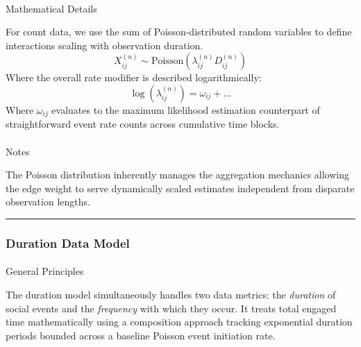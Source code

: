 \documentclass[
  letterpaper,
  DIV=11,
  numbers=noendperiod]{scrartcl}
\makeatletter
\let\oldparagraph\paragraph
\renewcommand{\paragraph}{
    \@ifstar
      \xxxParagraphStar
      \xxxParagraphNoStar
  }
\newcommand{\xxxParagraphStar}[1]{\oldparagraph*{#1}\mbox{}}
\newcommand{\xxxParagraphNoStar}[1]{\oldparagraph{#1}\mbox{}}
\makeatother
\begin{document}
\paragraph{Mathematical Details}\label{mathematical-details-1}

For count data, we use the sum of Poisson-distributed random variables
to define interactions scaling with observation duration. \[
X_{ij}^{(n)} \sim \text{Poisson}(\lambda_{ij}^{(n)} D_{ij}^{(n)})
\] Where the overall rate modifier is described logarithmically: \[
\log(\lambda_{ij}^{(n)}) = \omega_{ij} + \dots
\] Where \(\omega_{ij}\) evaluates to the maximum likelihood estimation
counterpart of straightforward event rate counts across cumulative time
blocks.

\paragraph{Notes}\label{notes-1}

\begin{tcolorbox}[enhanced jigsaw, colframe=quarto-callout-note-color-frame, bottomtitle=1mm, coltitle=black, titlerule=0mm, colbacktitle=quarto-callout-note-color!10!white, colback=white, opacitybacktitle=0.6, rightrule=.15mm, toptitle=1mm, opacityback=0, arc=.35mm, left=2mm, title=\textcolor{quarto-callout-note-color}{\faInfo}\hspace{0.5em}{Note}, breakable, bottomrule=.15mm, toprule=.15mm, leftrule=.75mm]

The Poisson distribution inherently manages the aggregation mechanics
allowing the edge weight to serve dynamically scaled estimates
independent from disparate observation lengths.

\end{tcolorbox}

\begin{center}\rule{0.5\linewidth}{0.5pt}\end{center}

\subsubsection{Duration Data Model}\label{duration-data-model}

\paragraph{General Principles}\label{general-principles-5}

The duration model simultaneously handles two data metrics: the
\emph{duration} of social events and the \emph{frequency} with which
they occur. It treats total engaged time mathematically using a
composition approach tracking exponential duration periods bounded
across a baseline Poisson event initiation rate.
\end{document}
